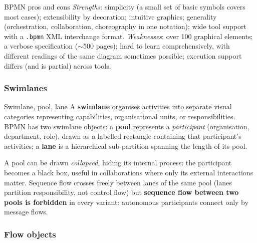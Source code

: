 \begin{notebox}{BPMN pros and cons}
\emph{Strengths}: simplicity (a small set of basic symbols covers most cases); extensibility by decoration; intuitive graphics; generality (orchestration, collaboration, choreography in one notation); wide tool support with a \texttt{.bpmn} XML interchange format. \emph{Weaknesses}: over 100 graphical elements; a verbose specification ($\sim$500 pages); hard to learn comprehensively, with different readings of the same diagram sometimes possible; execution support differs (and is partial) across tools.
\end{notebox}

\subsubsection{Swimlanes}

\begin{definitionbox}{Swimlane, pool, lane}
A \textbf{swimlane} organises activities into separate visual categories representing capabilities, organisational units, or responsibilities. BPMN has two swimlane objects: a \textbf{pool} represents a \emph{participant} (organisation, department, role), drawn as a labelled rectangle containing that participant's activities; a \textbf{lane} is a hierarchical sub-partition spanning the length of its pool.
\end{definitionbox}

A pool can be drawn \emph{collapsed}, hiding its internal process: the participant becomes a black box, useful in collaborations where only its external interactions matter. Sequence flow crosses freely between lanes of the same pool (lanes partition responsibility, not control flow) but \textbf{sequence flow between two pools is forbidden} in every variant: autonomous participants connect only by message flows.

\subsubsection{Flow objects}

